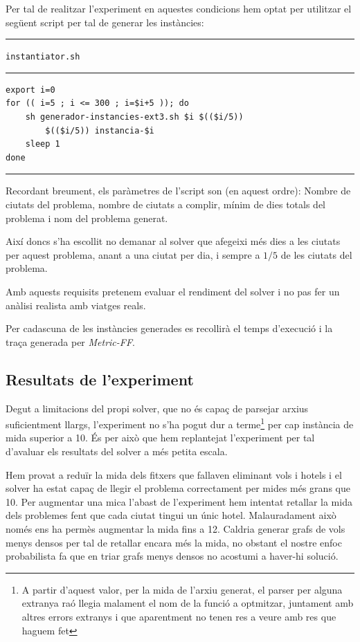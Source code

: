 \documentclass[11pt,a4paper]{article}
\begin{document}
Per tal de realitzar l'experiment en aquestes condicions hem optat per utilitzar el següent script per tal de generar les instàncies:

\begin{samepage}
\medskip
\noindent
\rule{0.1\textwidth}{0.5mm}
\texttt{instantiator.sh}
\rule{0.65\textwidth}{0.5mm}
\begin{verbatim}
export i=0
for (( i=5 ; i <= 300 ; i=$i+5 )); do
    sh generador-instancies-ext3.sh $i $(($i/5))
        $(($i/5)) instancia-$i
    sleep 1
done
\end{verbatim}
\rule{\textwidth}{0.5mm}
\end{samepage}

Recordant breument, els paràmetres de l'script son (en aquest ordre): Nombre de ciutats del problema, nombre de ciutats a complir, mínim de dies totals del problema i nom del problema generat.

Així doncs s'ha escollit no demanar al solver que afegeixi més dies a les ciutats per aquest problema, anant a una ciutat per dia, i sempre a $1/5$ de les ciutats del problema. 

Amb aquests requisits pretenem evaluar el rendiment del solver i no pas fer un anàlisi realista amb viatges reals.


Per cadascuna de les instàncies generades es recollirà el temps d'execució i la traça generada per \emph{Metric-FF}.


\subsection{Resultats de l'experiment}

Degut a limitacions del propi solver, que no és capaç de parsejar arxius suficientment llargs, l'experiment no s'ha pogut dur a terme\footnote{A partir d'aquest valor, per la mida de l'arxiu generat, el parser per alguna extranya raó llegia malament el nom de la funció a optmitzar, juntament amb altres errors extranys i que aparentment no tenen res a veure amb res que haguem fet} per cap instància de mida superior a 10. És per això que hem replantejat l'experiment per tal d'avaluar els resultats del solver a més petita escala. 

Hem provat a reduïr la mida dels fitxers que fallaven eliminant vols i hotels i el solver ha estat capaç de llegir el problema correctament per mides més grans que 10. Per augmentar una mica l'abast de l'experiment hem intentat retallar la mida dels problemes fent que cada ciutat tingui un únic hotel. Malauradament això només ens ha permès augmentar la mida fins a 12. Caldria generar grafs de vols menys densos per tal de retallar encara més la mida, no obstant el nostre enfoc probabilista fa que en triar grafs menys densos no acostumi a haver-hi solució.
\end{document}
